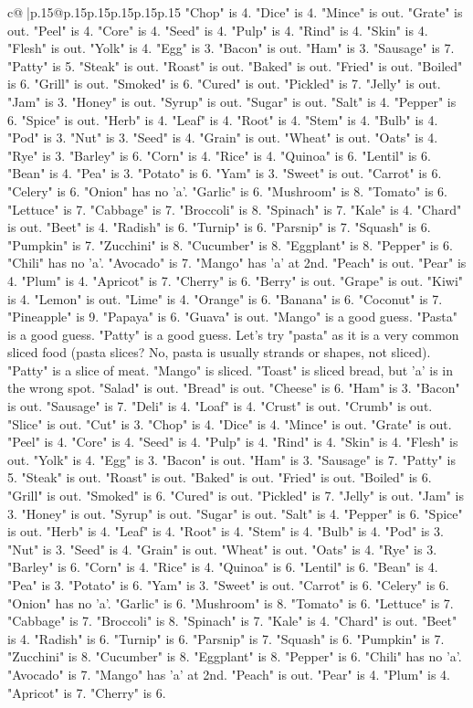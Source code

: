\documentclass{article}
\begin{document}
{\begin{supertabular}{c@{$\;$}|p{.15\linewidth}@{}p{.15\linewidth}p{.15\linewidth}p{.15\linewidth}p{.15\linewidth}p{.15\linewidth}}
{{{"Chop" is 4. "Dice" is 4. "Mince" is out. "Grate" is out. "Peel" is 4. "Core" is 4. "Seed" is 4. "Pulp" is 4. "Rind" is 4. "Skin" is 4. "Flesh" is out. "Yolk" is 4. "Egg" is 3. "Bacon" is out. "Ham" is 3. "Sausage" is 7. "Patty" is 5. "Steak" is out. "Roast" is out. "Baked" is out. "Fried" is out. "Boiled" is 6. "Grill" is out. "Smoked" is 6. "Cured" is out. "Pickled" is 7. "Jelly" is out. "Jam" is 3. "Honey" is out. "Syrup" is out. "Sugar" is out. "Salt" is 4. "Pepper" is 6. "Spice" is out. "Herb" is 4. "Leaf" is 4. "Root" is 4. "Stem" is 4. "Bulb" is 4. "Pod" is 3. "Nut" is 3. "Seed" is 4. "Grain" is out. "Wheat" is out. "Oats" is 4. "Rye" is 3. "Barley" is 6. "Corn" is 4. "Rice" is 4. "Quinoa" is 6. "Lentil" is 6. "Bean" is 4. "Pea" is 3. "Potato" is 6. "Yam" is 3. "Sweet" is out. "Carrot" is 6. "Celery" is 6. "Onion" has no 'a'. "Garlic" is 6. "Mushroom" is 8. "Tomato" is 6. "Lettuce" is 7. "Cabbage" is 7. "Broccoli" is 8. "Spinach" is 7. "Kale" is 4. "Chard" is out. "Beet" is 4. "Radish" is 6. "Turnip" is 6. "Parsnip" is 7. "Squash" is 6. "Pumpkin" is 7. "Zucchini" is 8. "Cucumber" is 8. "Eggplant" is 8. "Pepper" is 6. "Chili" has no 'a'. "Avocado" is 7. "Mango" has 'a' at 2nd. "Peach" is out. "Pear" is 4. "Plum" is 4. "Apricot" is 7. "Cherry" is 6. "Berry" is out. "Grape" is out. "Kiwi" is 4. "Lemon" is out. "Lime" is 4. "Orange" is 6. "Banana" is 6. "Coconut" is 7. "Pineapple" is 9. "Papaya" is 6. "Guava" is out. "Mango" is a good guess. "Pasta" is a good guess. "Patty" is a good guess. Let's try "pasta" as it is a very common sliced food (pasta slices? No, pasta is usually strands or shapes, not sliced). "Patty" is a slice of meat. "Mango" is sliced. "Toast" is sliced bread, but 'a' is in the wrong spot. "Salad" is out. "Bread" is out. "Cheese" is 6. "Ham" is 3. "Bacon" is out. "Sausage" is 7. "Deli" is 4. "Loaf" is 4. "Crust" is out. "Crumb" is out. "Slice" is out. "Cut" is 3. "Chop" is 4. "Dice" is 4. "Mince" is out. "Grate" is out. "Peel" is 4. "Core" is 4. "Seed" is 4. "Pulp" is 4. "Rind" is 4. "Skin" is 4. "Flesh" is out. "Yolk" is 4. "Egg" is 3. "Bacon" is out. "Ham" is 3. "Sausage" is 7. "Patty" is 5. "Steak" is out. "Roast" is out. "Baked" is out. "Fried" is out. "Boiled" is 6. "Grill" is out. "Smoked" is 6. "Cured" is out. "Pickled" is 7. "Jelly" is out. "Jam" is 3. "Honey" is out. "Syrup" is out. "Sugar" is out. "Salt" is 4. "Pepper" is 6. "Spice" is out. "Herb" is 4. "Leaf" is 4. "Root" is 4. "Stem" is 4. "Bulb" is 4. "Pod" is 3. "Nut" is 3. "Seed" is 4. "Grain" is out. "Wheat" is out. "Oats" is 4. "Rye" is 3. "Barley" is 6. "Corn" is 4. "Rice" is 4. "Quinoa" is 6. "Lentil" is 6. "Bean" is 4. "Pea" is 3. "Potato" is 6. "Yam" is 3. "Sweet" is out. "Carrot" is 6. "Celery" is 6. "Onion" has no 'a'. "Garlic" is 6. "Mushroom" is 8. "Tomato" is 6. "Lettuce" is 7. "Cabbage" is 7. "Broccoli" is 8. "Spinach" is 7. "Kale" is 4. "Chard" is out. "Beet" is 4. "Radish" is 6. "Turnip" is 6. "Parsnip" is 7. "Squash" is 6. "Pumpkin" is 7. "Zucchini" is 8. "Cucumber" is 8. "Eggplant" is 8. "Pepper" is 6. "Chili" has no 'a'. "Avocado" is 7. "Mango" has 'a' at 2nd. "Peach" is out. "Pear" is 4. "Plum" is 4. "Apricot" is 7. "Cherry" is 6. }}}
\end{supertabular}}
\end{document}
